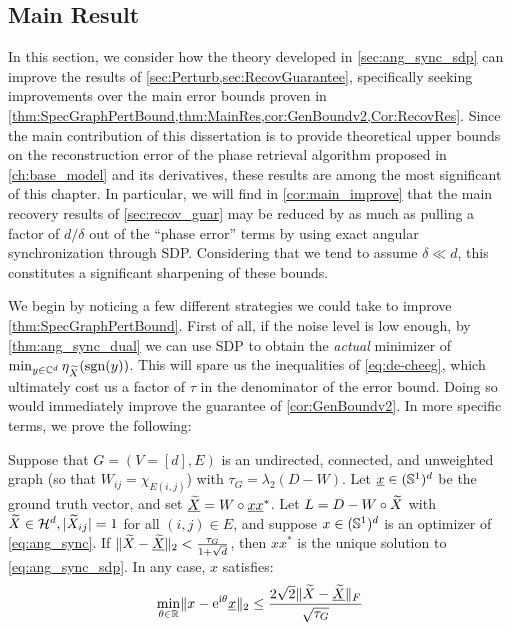 \subsection{Main Result}
In this section, we consider how the theory developed in \cref{sec:ang_sync_sdp} can improve the results of \cref{sec:Perturb,sec:RecovGuarantee}, specifically seeking improvements over the main error bounds proven in \cref{thm:SpecGraphPertBound,thm:MainRes,cor:GenBoundv2,Cor:RecovRes}.  Since the main contribution of this dissertation is to provide theoretical upper bounds on the reconstruction error of the phase retrieval algorithm proposed in \cref{ch:base_model} and its derivatives, these results are among the most significant of this chapter.  In particular, we will find in \cref{cor:main_improve} that the main recovery results of \cref{sec:recov_guar} may be reduced by as much as pulling a factor of $d / \delta$ out of the ``phase error'' terms by using exact angular synchronization through SDP.  Considering that we tend to assume $\delta \ll d$, this constitutes a significant sharpening of these bounds.

We begin by noticing a few different strategies we could take to improve \cref{thm:SpecGraphPertBound}.  First of all, if the noise level is low enough, by \cref{thm:ang_sync_dual} we can use SDP to obtain the \emph{actual} minimizer of $\min_{y \in \mathbb{C}^d} \eta_{\widetilde{X}}(\operatorname{sgn}(y))$.  This will spare us the inequalities of \eqref{eq:de-cheeg}, which ultimately cost us a factor of $\tau$ in the denominator of the error bound.  Doing so would immediately improve the guarantee of \cref{cor:GenBoundv2}.  In more specific terms, we prove the following:

\begin{theorem}
  Suppose that $G = (V=[d], E)$ is an undirected, connected, and unweighted graph (so that $W_{ij} = \chi_{E(i, j)}$) with $\tau_G = \lambda_2(D - W)$.  Let $\underline{x} \in (\mathbb{S}^1)^d$ be the ground truth vector, and set $\underline{\widetilde{X}} = W \circ \underline{x} \underline{x}^*$.  Let $L = D - W \circ \widetilde{X}$ with $\widetilde{X} \in \mathcal{H}^d, |\widetilde{X}_{ij}| = 1$ for all $(i, j) \in E$, and suppose $x \in (\mathbb{S}^1)^d$ is an optimizer of \eqref{eq:ang_sync}.  If $\lVert \widetilde{X} - \underline{\widetilde{X}} \rVert_2 < \frac{\tau_G}{1 + \sqrt{d}}$, then $x x^*$ is the unique solution to \eqref{eq:ang_sync_sdp}.  In any case, $x$ satisfies:
  \begin{equation}
    \min_{\theta \in \mathbb{R}} \lVert x - \mathrm{e}^{\mathrm{i} \theta} \underline{x} \rVert_2 \le
    \dfrac{2 \sqrt{2} \lVert \widetilde{X} - \underline{\widetilde{X}} \rVert_F}{\sqrt{\tau_G}} \label{eq:ISP2}
  \end{equation}
  \label{thm:improved_spec_pert}
\end{theorem}


